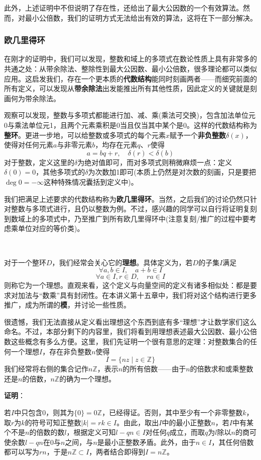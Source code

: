 \documentclass[a4paper,UTF8,fontset=windows,AutoFakeBold]{ctexart}
\newcommand{\proo}[1]{{\vspace{5pt}\kaishu\noindent\textbf{证明}：\vspace{-3pt}
\begin{compactitem}
    \item[] #1
\end{compactitem}
}}
\begin{document}
此外，上述证明中不但说明了存在性，还给出了最大公因数的一个有效算法。然而，对最小公倍数，我们的证明方式无法给出有效的算法，这将在下一部分解决。

\subsubsection{欧几里得环}
在刚才的证明中，我们可以发现，整数和域上的多项式在数论性质上具有非常多的共通之处：从带余除法、整除性到最大公因数、最小公倍数，很多理论都可以类似应用。这启发我们，存在一个更本质的\textbf{代数结构}能同时刻画两者——而细究前面的所有定义，可以发现从\textbf{带余除法}出发能推出所有其他性质，因此定义的关键就是刻画何为带余除法。

观察可以发现，整数与多项式都能进行加、减、乘(乘法可交换)，包含加法单位元0与乘法单位元1，且两个元素乘积是0当且仅当其中某个是0。这样的代数结构称为\textbf{整环}。更进一步地，可以给整数或多项式的每个元素$x$赋予一个\textbf{非负整数}$\delta(x)$，使得对任何元素$a$与非零元素$b$，均存在元素$q$、$r$使得
$$a=bq+r,\quad\delta(r)<\delta(b)$$
对于整数，定义这里的$\delta$为绝对值即可，而对多项式则稍微麻烦一点：定义$\delta(0)=0$，其他多项式的$\delta$为次数加1即可(本质上仍然是对次数的刻画，只是要把$\deg 0=-\infty$这种特殊情况囊括到定义中)。

我们把满足上述要求的代数结构称为\textbf{欧几里得环}。当然，之后我们的讨论仍然只针对整数与多项式进行，且仍以整数为例。不过，感兴趣的同学可以自行将证明复刻到数域上的多项式中，乃至推广到所有欧几里得环中(注意复刻/推广的过程中要考虑乘单位对应的等价类)。

\

对于一个整环$D$，我们经常会关心它的\textbf{理想}。具体定义为，若$D$的子集$I$满足
$$\forall a,b\in I,\quad a+b\in I$$
$$\forall a\in I,r\in D,\quad ra\in I$$
则称它为一个理想。直观来看，这个定义与向量空间的定义有诸多相似处：都是要求对加法与``数乘''具有封闭性。在本讲义第十五章中，我们将对这个结构进行更多推广，成为所谓的\textbf{模}，并讨论一些性质。

很遗憾，我们无法直接从定义看出理想这个东西到底有多``理想''才让数学家们这么命名。不过，本部分剩下的内容里，我们将看到用理想表述最大公因数、最小公倍数这些概念有多么方便。这里，我们先证明一个很有意思的定理：对整数集合的任何一个理想$I$，存在非负整数$n$使得
$$I=\{nz\mid z\in\mathbb{Z}\}$$
我们经常将右侧的集合记作$n\mathbb{Z}$，表示$n$的所有倍数——由于$n$的倍数求和或乘整数还是$n$的倍数，$n\mathbb{Z}$的确为一个理想。

\proo{
    若$I$中只包含0，则其为$\{0\}=0\mathbb{Z}$，已经得证。否则，其中至少有一个非零整数$k$，取$r$为$k$的符号可知正整数$|k|=rk\in I$。由此，取出$I$中的最小正整数$n$，若$I$中有某个不是$n$的倍数的数$l$，根据定义可知$l-qn\in I$对任何$q$成立，而取$q$为$l$除以$n$的商可使余数$l-qn$在0与$n$之间，与$n$是最小正整数矛盾。此外，由于$n\in I$，其任何倍数都可以写为$rn$，于是$n\mathbb{Z}\subset I$，两者结合即得到$I=n\mathbb{Z}$。
}
\end{document}
